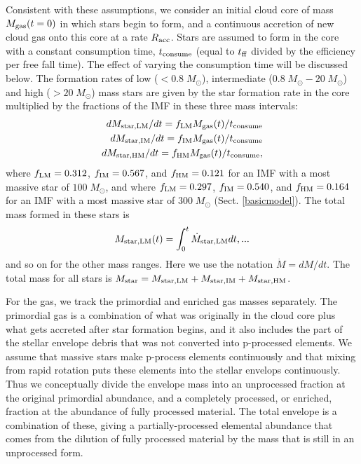 \documentclass[12pt,preprint]{aastex}
\begin{document}
Consistent with these assumptions, we consider an initial cloud core of mass
$M_{\rm gas}(t=0)$ in which stars begin to form, and a continuous accretion of new
cloud gas onto this core at a rate $R_{\rm acc}$. Stars are assumed to form in the
core with a constant consumption time, $t_{\rm consume}$ (equal to $t_{\rm ff}$
divided by the efficiency per free fall time). The effect of varying the
consumption time will be discussed below. The formation rates of low
($<0.8\;M_\odot$), intermediate ($0.8\;M_\odot-20\;M_\odot$) and high
($>20\;M_\odot$) mass stars are given by the star formation rate in the core
multiplied by the fractions of the IMF in these three mass intervals:
\begin{eqnarray}
dM_{\rm star,LM}/dt= f_{\rm LM}M_{\rm gas}(t)/t_{\rm consume}\label{e1}\\
dM_{\rm star,IM}/dt= f_{\rm IM}M_{\rm gas}(t)/t_{\rm consume}\label{e2}\\
dM_{\rm star,HM}/dt= f_{\rm HM}M_{\rm gas}(t)/t_{\rm consume},
\label{e3}
\end{eqnarray}
where $f_{\rm LM}=0.312$, $f_{\rm IM}=0.567$, and $f_{\rm HM}=0.121$ for an IMF
with a most massive star of $100\;M_\odot$, and where $f_{\rm LM}=0.297$, $f_{\rm
IM}=0.540$, and $f_{\rm HM}=0.164$ for an IMF with a most massive star of
$300\;M_\odot$ (Sect. \ref{basicmodel}). The total mass formed in these stars is
\begin{equation}
M_{\rm star,LM}(t)=\int_0^t {\dot M}_{\rm star,LM} dt, ...
\end{equation}
and so on for the other mass ranges. Here we use the notation ${\dot M}=dM/dt$. The
total mass for all stars is $M_{\rm star}=M_{\rm star,LM}+M_{\rm star,IM}+M_{\rm
star,HM}$.

For the gas, we track the primordial and enriched gas masses separately. The
primordial gas is a combination of what was originally in the cloud core plus what
gets accreted after star formation begins, and it also includes the part of the
stellar envelope debris that was not converted into p-processed elements. We assume
that massive stars make p-process elements continuously and that mixing from rapid
rotation puts these elements into the stellar envelops continuously. Thus we
conceptually divide the envelope mass into an unprocessed fraction at the original
primordial abundance, and a completely processed, or enriched, fraction at the
abundance of fully processed material. The total envelope is a combination of
these, giving a partially-processed elemental abundance that comes from the
dilution of fully processed material by the mass that is still in an unprocessed
form.
\end{document}
